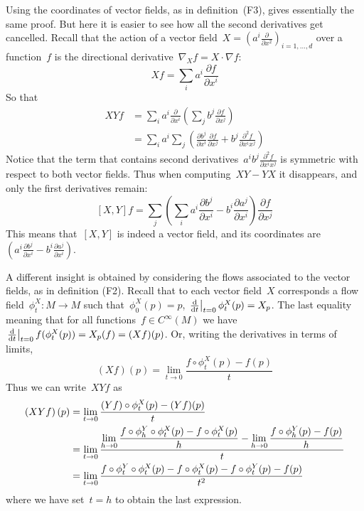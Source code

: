 Using the coordinates of vector fields, as in definition~(F3), gives
essentially the same proof.  But here it is easier to see how all the second
derivatives get cancelled.  Recall that the action of a vector
field~$X=\left(a^i\frac\partial{\partial x^2}\right)_{i=1,\ldots,d}$ over a
function~$f$ is the directional derivative~$\nabla_Xf=X\cdot\nabla f$:
\[
	Xf = \sum_ia^i\frac{\partial f}{\partial x^i}
\]
So that
\begin{align*}
	XYf &= \sum_ia^i\frac{\partial }{\partial x^i}
	\left(
		\sum_j b^j\frac{\partial f}{\partial x^j}
	\right)
	\\
	&= \sum_ia^i\sum_j\left(
		\frac{\partial b^j}{\partial x^i}
		\frac{\partial f}{\partial x^j}
		+b^j\frac{\partial^2f}{\partial x^ix^j}
	\right)
\end{align*}
Notice that the term that contains second
derivatives~$a^ib^j\frac{\partial^2f}{\partial x^ix^j}$ is symmetric with
respect to both vector fields.  Thus when computing~$XY-YX$ it disappears,
and only the first derivatives remain:
$$
[X,Y]f = \sum_j
\left(
	\sum_i
	a^i\frac{\partial b^j}{\partial x^i}
	-
	b^i\frac{\partial a^j}{\partial x^i}
\right)
\frac{\partial f}{\partial x^j}
$$
This means that~$[X,Y]$ is indeed a vector field, and its coordinates are
$
\left(
	a^i\frac{\partial b^j}{\partial x^i}
	-
	b^i\frac{\partial a^j}{\partial x^i}
\right)
$.

A different insight is obtained by considering the flows associated to the
vector fields, as in definition (F2).  Recall that to each vector field~$X$
corresponds a flow field~$\phi^X_t:M\to M$ such that~$\phi^X_0(p)=p$,
$\left.\frac{\mathrm{d}}{\mathrm{d} t}\right|_{t=0}\phi^X_t(p)=X_p$.  The last equality
meaning that for all functions~$f\in C^\infty(M)$ we have
$\left.\frac{\mathrm{d}}{\mathrm{d} t}\right|_{t=0}f(\phi^X_t(p))=X_p(f)=(Xf)(p)$.  Or,
writing the derivatives in terms of limits,
\[
	(Xf)(p) = \lim_{t\to0}\frac{f\circ\phi^X_t(p)-f(p)}t
\]
Thus we can write~$XYf$ as
\begin{align*}
	\left(XYf\right)(p)
	&= \lim_{t\to0}\frac{(Yf)\circ\phi^X_t(p)-(Yf)(p)}{t}\\
	&= \lim_{t\to0}\frac{\displaystyle
		\lim_{h\to 0}\frac{f\circ\phi^Y_h\circ\phi^X_t(p)-f\circ\phi^X_t(p)}h
		-\lim_{h\to 0}\frac{f\circ\phi^Y_h(p)-f(p)}h
	}t\\
	&= \lim_{t\to0}\frac{
		f\circ\phi^Y_t\circ\phi^X_t(p)-f\circ\phi^X_t(p)-f\circ\phi^Y_t(p)-f(p)
	}{t^2}
\end{align*}
where we have set~$t=h$ to obtain the last expression.

